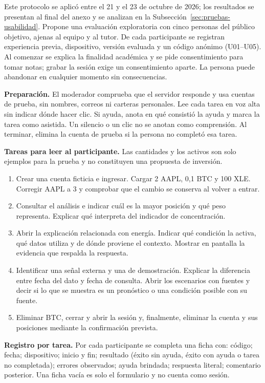 \label{annex:protocolo-usuarios}

Este protocolo se aplicó entre el 21 y el 23 de octubre de 2026; los resultados se presentan al final del anexo y se analizan en la Subsección~\ref{sec:pruebas-usabilidad}. Propone una evaluación exploratoria con cinco personas del público objetivo, ajenas al equipo y al tutor. De cada participante se registran experiencia previa, dispositivo, versión evaluada y un código anónimo (U01--U05). Al comenzar se explica la finalidad académica y se pide consentimiento para tomar notas; grabar la sesión exige un consentimiento aparte. La persona puede abandonar en cualquier momento sin consecuencias.

\textbf{Preparación.} El moderador comprueba que el servidor responde y usa cuentas de prueba, sin nombres, correos ni carteras personales. Lee cada tarea en voz alta sin indicar dónde hacer clic. Si ayuda, anota en qué consistió la ayuda y marca la tarea como asistida. Un silencio o un clic no se anotan como comprensión. Al terminar, elimina la cuenta de prueba si la persona no completó esa tarea.

\textbf{Tareas para leer al participante.} Las cantidades y los activos son solo ejemplos para la prueba y no constituyen una propuesta de inversión.
\begin{enumerate}
\item Crear una cuenta ficticia e ingresar. Cargar 2 AAPL, 0,1 BTC y 100 XLE. Corregir AAPL a 3 y comprobar que el cambio se conserva al volver a entrar.
\item Consultar el análisis e indicar cuál es la mayor posición y qué peso representa. Explicar qué interpreta del indicador de concentración.
\item Abrir la explicación relacionada con energía. Indicar qué condición la activa, qué datos utiliza y de dónde proviene el contexto. Mostrar en pantalla la evidencia que respalda la respuesta.
\item Identificar una señal externa y una de demostración. Explicar la diferencia entre fecha del dato y fecha de consulta. Abrir los escenarios con fuentes y decir si lo que se muestra es un pronóstico o una condición posible con su fuente.
\item Eliminar BTC, cerrar y abrir la sesión y, finalmente, eliminar la cuenta y sus posiciones mediante la confirmación prevista.
\end{enumerate}

\textbf{Registro por tarea.} Por cada participante se completa una ficha con: código; fecha; dispositivo; inicio y fin; resultado (éxito sin ayuda, éxito con ayuda o tarea no completada); errores observados; ayuda brindada; respuesta literal; comentario posterior. Una ficha vacía es solo el formulario y no cuenta como sesión.

